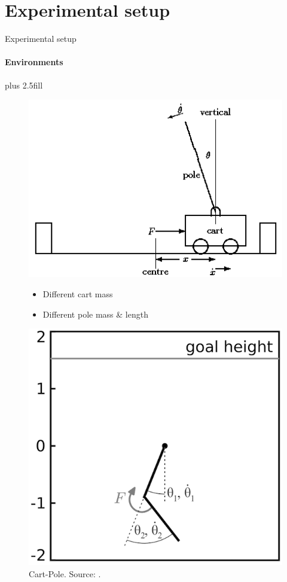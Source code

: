 \section{Experimental setup}
\begin{frame}[fragile]{Experimental setup}
\framesubtitle{Environments}
\vskip1.1cm plus 2.5fill
\begin{figure}[htb]
    \begin{minipage}{0.55\textwidth}
            \includegraphics[width=\linewidth]{cartpole.png}
            \caption{Cart-Pole. Source: \cite{grant1990modelling}.}
            \vskip0.9cm
            \begin{itemize}
                \item Different cart mass
                \item Different pole mass \& length
            \end{itemize}
    \end{minipage}\hfill
    \begin{minipage}{0.45\textwidth}
            \includegraphics[width=\linewidth]{acrobot.png}

\end{minipage}
\end{figure}
\end{frame}
